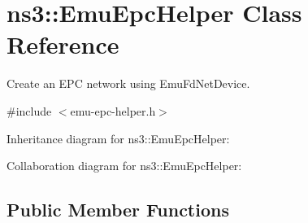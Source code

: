 \hypertarget{classns3_1_1EmuEpcHelper}{}\section{ns3\+:\+:Emu\+Epc\+Helper Class Reference}
\label{classns3_1_1EmuEpcHelper}


Create an E\+PC network using Emu\+Fd\+Net\+Device.  




{\ttfamily \#include $<$emu-\/epc-\/helper.\+h$>$}



Inheritance diagram for ns3\+:\+:Emu\+Epc\+Helper\+:


Collaboration diagram for ns3\+:\+:Emu\+Epc\+Helper\+:
\subsection*{Public Member Functions}

